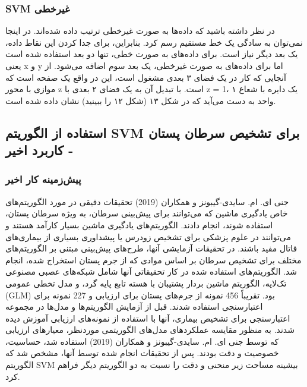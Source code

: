\documentclass{CSICC2020}
\begin{document}
\subsubsection{SVM غیرخطی}
در نظر داشته باشید که داده‌ها به صورت غیرخطی ترتیب داده شده‌اند. در اینجا نمی‌توان به سادگی یک خط مستقیم رسم کرد. بنابراین، برای جدا کردن این نقاط داده، یک بعد دیگر نیاز است. برای داده‌های به صورت خطی، تنها دو بعد استفاده شده است یعنی x و y اما برای داده‌های به صورت غیرخطی، یک بعد سوم اضافه می‌شود. از آنجایی که کار در یک فضای ۳ بعدی مشغول است، این در واقع یک صفحه است که موازی با محور z است. با تبدیل آن به یک فضای ۲ بعدی با z = 1، یک دایره با شعاع ۱ واحد به دست می‌آید که در شکل ۱۳ (شکل ۱۲ را ببینید) نشان داده شده است. 
\subsection{استفاده از الگوریتم SVM برای تشخیص سرطان پستان - کاربرد اخیر }

\subsubsection{پیش‌زمینه کار اخیر}
جنی ای. ام. سایدی-گیبونز و همکاران (2019)  تحقیقات دقیقی در مورد الگوریتم‌های خاص یادگیری ماشین که می‌توانند برای پیش‌بینی سرطان، به ویژه سرطان پستان، استفاده شوند، انجام دادند. الگوریتم‌های یادگیری ماشین بسیار کارآمد هستند و می‌توانند در علوم پزشکی برای تشخیص زودرس یا پیشداوری بسیاری از بیماری‌های فاتال مفید باشند. در تحقیقات آزمایشی آنها، طرح‌های پیش‌بینی مبتنی بر الگوریتم‌های مختلف برای تشخیص سرطان بر اساس موادی که از جرم پستان استخراج شده، انجام شد. الگوریتم‌های استفاده شده در کار تحقیقاتی آنها شامل شبکه‌های عصبی مصنوعی تک‌لایه، الگوریتم ماشین بردار پشتیبان با هسته تابع پایه گرد، و مدل تخطی عمومی (GLM) بود. تقریباً 456 نمونه از جرم‌های پستان برای ارزیابی و 227 نمونه برای اعتبارسنجی استفاده شدند. قبل از آزمایش الگوریتم‌ها و مدل‌ها در مجموعه اعتبارسنجی برای تشخیص بیماری، آنها با استفاده از نمونه‌های ارزیابی آموزش دیده شدند. به منظور مقایسه عملکردهای مدل‌های الگوریتمی موردنظر، معیارهای ارزیابی که توسط جنی ای. ام. سایدی-گیبونز و همکاران (2019)  استفاده شد، حساسیت، خصوصیت و دقت بودند. پس از تحقیقات انجام شده توسط آنها، مشخص شد که الگوریتم SVM بیشینه مساحت زیر منحنی و دقت را نسبت به دو الگوریتم دیگر فراهم کرد. 
\end{document}
